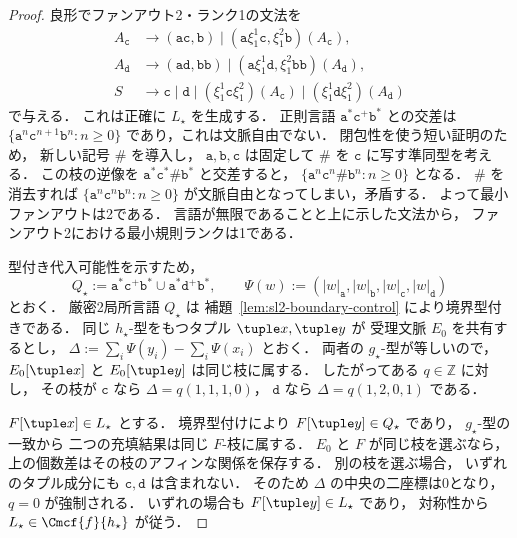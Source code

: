 \begin{proof}
良形でファンアウト2・ランク1の文法を
\[
\begin{aligned}
 A_{\mathtt c}
   &\to(\mathtt a\mathtt c,\mathtt b)
     \mid(\mathtt a\xi_1^1\mathtt c,\xi_1^2\mathtt b)(A_{\mathtt c}),\\
 A_{\mathtt d}
   &\to(\mathtt a\mathtt d,\mathtt b\mathtt b)
     \mid(\mathtt a\xi_1^1\mathtt d,\xi_1^2\mathtt b\mathtt b)(A_{\mathtt d}),\\
 S&\to\mathtt c\mid\mathtt d
   \mid(\xi_1^1\mathtt c\xi_1^2)(A_{\mathtt c})
   \mid(\xi_1^1\mathtt d\xi_1^2)(A_{\mathtt d})
\end{aligned}
\]
で与える．
これは正確に $L_\star$ を生成する．
正則言語
$\mathtt a^*\mathtt c^+\mathtt b^*$
との交差は
$\{\mathtt a^n\mathtt c^{n+1}\mathtt b^n:n\ge0\}$
であり，これは文脈自由でない．
閉包性を使う短い証明のため，
新しい記号 $\mathtt\#$ を導入し，
$\mathtt a,\mathtt b,\mathtt c$ は固定して
$\mathtt\#$ を $\mathtt c$ に写す準同型を考える．
この枝の逆像を
$\mathtt a^*\mathtt c^*\mathtt\#\mathtt b^*$
と交差すると，
\(\{\mathtt a^n\mathtt c^n\mathtt\#\mathtt b^n:n\ge0\}\)
となる．
$\mathtt\#$ を消去すれば
$\{\mathtt a^n\mathtt c^n\mathtt b^n:n\ge0\}$
が文脈自由となってしまい，矛盾する．
よって最小ファンアウトは2である．
言語が無限であることと上に示した文法から，
ファンアウト2における最小規則ランクは1である．

型付き代入可能性を示すため，
\[
 Q_\star:=
   \mathtt a^*\mathtt c^+\mathtt b^*
   \cup\mathtt a^*\mathtt d^+\mathtt b^*,
 \qquad
 \Psi(w):=(|w|_{\mathtt a},|w|_{\mathtt b},
            |w|_{\mathtt c},|w|_{\mathtt d})
\]
とおく．
厳密2局所言語 $Q_\star$ は
補題~\ref{lem:sl2-boundary-control} により境界型付きである．
同じ $h_\star$-型をもつタプル
$\tuple x,\tuple y$ が
受理文脈 $E_0$ を共有するとし，
\(\Delta:=\sum_i\Psi(y_i)-\sum_i\Psi(x_i)\)
とおく．
両者の $g_\star$-型が等しいので，
$E_0[\tuple x]$ と $E_0[\tuple y]$
は同じ枝に属する．
したがってある $q\in\mathbb Z$ に対し，
その枝が $\mathtt c$ なら
$\Delta=q(1,1,1,0)$，
$\mathtt d$ なら
$\Delta=q(1,2,0,1)$ である．

$F[\tuple x]\in L_\star$ とする．
境界型付けにより
$F[\tuple y]\in Q_\star$ であり，
$g_\star$-型の一致から
二つの充填結果は同じ $F$-枝に属する．
$E_0$ と $F$ が同じ枝を選ぶなら，
上の個数差はその枝のアフィンな関係を保存する．
別の枝を選ぶ場合，
いずれのタプル成分にも
$\mathtt c,\mathtt d$ は含まれない．
そのため $\Delta$ の中央の二座標は0となり，
$q=0$ が強制される．
いずれの場合も $F[\tuple y]\in L_\star$ であり，
対称性から
$L_\star\in\Cmcf{f}{h_\star}$ が従う．


\end{proof}
